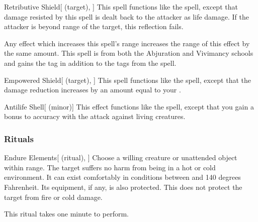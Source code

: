 \lowercase{\hypertarget{spell:Retributive Shield}{}}\label{spell:Retributive Shield}
\begin{attuneability}[\nth{3}]{\hypertarget{spell:Retributive Shield}{Retributive Shield}}[ (target), ]
This spell functions like the  spell, except that damage resisted by this spell is dealt back to the attacker as life damage.
If the attacker is beyond \rngclose range of the target, this reflection fails.

Any effect which increases this spell's range increases the range of this effect by the same amount.
This spell is from both the Abjuration and Vivimancy schools and gains the  tag in addition to the tags from the  spell.
\end{attuneability}
\vspace{0.25em}



\lowercase{\hypertarget{spell:Empowered Shield}{}}\label{spell:Empowered Shield}
\begin{attuneability}[\nth{4}]{\hypertarget{spell:Empowered Shield}{Empowered Shield}}[ (target), ]
This spell functions like the  spell, except that the damage reduction increases by an amount equal to your .
\end{attuneability}
\vspace{0.25em}



\lowercase{\hypertarget{spell:Antilife Shell}{}}\label{spell:Antilife Shell}
\begin{apability}[\nth{5}]{\hypertarget{spell:Antilife Shell}{Antilife Shell}}[ (minor)]
This effect functions like the  spell, except that you gain a  bonus to accuracy with the attack against living creatures.
\end{apability}
\vspace{0.25em}



\subsubsection{Rituals}


\lowercase{\hypertarget{spell:Endure Elements}{}}\label{spell:Endure Elements}
\begin{attuneability}[\nth{1}]{\hypertarget{spell:Endure Elements}{Endure Elements}}[ (ritual), ]
Choose a willing creature or unattended object within \rngclose range.
The target suffers no harm from being in a hot or cold environment.
It can exist comfortably in conditions between  and 140 degrees Fahrenheit.
Its equipment, if any, is also protected.
This does not protect the target from fire or cold damage.

This ritual takes one minute to perform.
\end{attuneability}
\vspace{0.25em}



